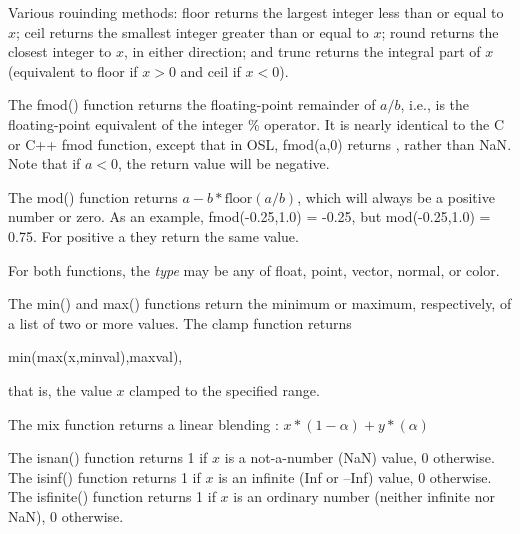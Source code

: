 \documentclass[11pt,letterpaper]{book}
\def\color{{\cf color}\xspace}
\def\normal{{\cf normal}\xspace}
\def\point{{\cf point}\xspace}
\def\vector{{\cf vector}\xspace}
\begin{document}
Various rouinding methods: {\cf floor} returns the largest integer less
than or equal to $x$; {\cf ceil} returns the smallest integer greater than
or equal to $x$; {\cf round} returns the closest integer to $x$, in
either direction; and {\cf trunc} returns the integral part of $x$
(equivalent to {\cf floor} if $x>0$ and {\cf ceil} if $x<0$).
\apiend


The {\cf fmod()} function returns the floating-point remainder of $a/b$,
i.e., is the floating-point equivalent of the integer {\cf \%} operator.
It is nearly identical to the C or C++ {\cf fmod} function, except that
in OSL, {\cf fmod(a,0)} returns {}, rather than {\cf NaN}.  Note
that if $a < 0$, the return value will be negative.

The {\cf mod()} function returns $a - b*\mbox{floor}(a/b)$, which will
always be a positive number or zero.  
As an example, {\cf fmod(-0.25,1.0) = -0.25}, but {\cf mod(-0.25,1.0) =
  0.75}.  For positive {\cf a} they return the same value.

For both functions, the \emph{type} may be any of {\cf float}, \point,
\vector, \normal, or \color.
\apiend

  
The {\cf min()} and {\cf max()} functions return the minimum or maximum,
respectively, of a list of two or more values.  The {\cf clamp}
function returns

\hspace{2em} {\cf min(max(x,minval),maxval)},

\noindent that is, the value $x$ clamped to the specified range.
\apiend

The {\cf mix} function returns a linear blending :
$ x*(1-\alpha) + y*(\alpha) $
\apiend

  
The {\cf isnan()} function returns 1 if $x$ is a not-a-number (NaN)
value, 0 otherwise.  The {\cf isinf()} function returns 1 if $x$ is an
infinite (Inf or --Inf) value, 0 otherwise.  The {\cf isfinite()}
function returns 1 if $x$ is an ordinary number (neither infinite nor
NaN), 0 otherwise.  \apiend
\end{document}

